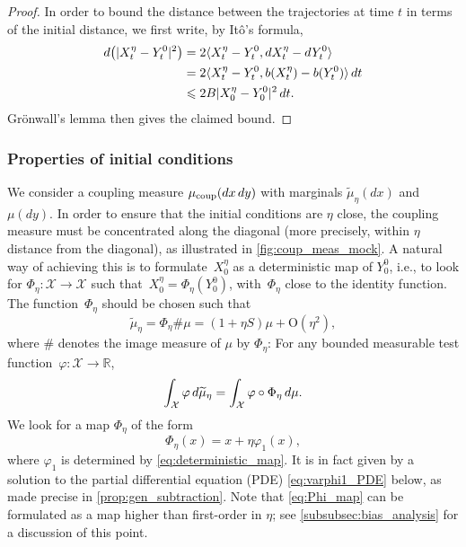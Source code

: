 \documentclass[11pt]{article}
\newcommand{\R}{\mathbb{R}}
\newcommand{\X}{\mathcal{X}}
\newcommand{\bigO}{\mathrm{O}}
\renewcommand{\leq}{\leqslant}
\DeclarePairedDelimiter\ip{\langle}{\rangle}
\theoremstyle{definition}
\newcommand{\psip}{\widetilde{\mu}_\eta}
\newcommand{\mucoup}{\mu_{\rm coup}}
\begin{document}
\begin{proof}
In order to bound the distance between the trajectories at time $t$ in terms of the initial distance, we first write, by It\^o's formula,
\begin{align*}
		d\bigl(|X_t^\eta - Y_t^0|^2\bigr) &= 2\ip{X_t^\eta - Y_t^0, dX_t^\eta - dY^0_t} \\
		&= 2\langle X_t^\eta - Y_t^0, b(X_t^\eta) - b(Y_t^0)\rangle \, dt \\
		&\leq 2B|X_0^\eta - Y_0^0|^2 \, dt.
		\label{eq:ito_dissip}
	\end{align*}
Gr\"onwall's lemma then gives the claimed bound. \end{proof}

\subsubsection{Properties of initial conditions}
\label{subsubsec:properties_init_cond}
We consider a coupling measure $\mucoup(dx \, dy)$ with marginals $\psip(dx)$ and $\mu(dy)$. In order to ensure that the initial conditions are $\eta$ close, the coupling measure must be concentrated along the diagonal (more precisely, within $\eta$ distance from the diagonal), as illustrated in \cref{fig:coup_meas_mock}. A natural way of achieving this is to formulate~$X_0^\eta$ as a deterministic map of $Y_0^0$, i.e., to look for $\Phi_\eta \colon \mathcal{X} \to \mathcal{X}$ such that~$X_0^\eta = \Phi_\eta(Y_0^0)$, with~$\Phi_\eta$ close to the identity function. The function~$\Phi_\eta$ should be chosen such that
\begin{equation}
	\psip = \Phi_\eta \# \mu = (1+\eta S)\mu + \bigO(\eta^2),
	\label{eq:deterministic_map}
\end{equation}
where $\#$ denotes the image measure of $\mu$ by $\Phi_\eta$: For any bounded measurable test function~$\varphi\colon \X \to \R$,
\begin{equation}
    \notag
	\int_\mathcal{X} \varphi \, d\psip = \int_\mathcal{X} \varphi \circ \Phi_\eta \, d\mu.
\end{equation}
We look for a map $\Phi_\eta$ of the form
\begin{equation}
	\Phi_\eta(x) = x + \eta\varphi_1(x),
	\label{eq:Phi_map}
\end{equation}
where $\varphi_1$ is determined by \eqref{eq:deterministic_map}. It is in fact given by a solution to the partial differential equation (PDE) \eqref{eq:varphi1_PDE} below, as made precise in \cref{prop:gen_subtraction}.
Note that \eqref{eq:Phi_map} can be formulated as a map higher than first-order in $\eta$; see \cref{subsubsec:bias_analysis} for a discussion of this point.
\end{document}
